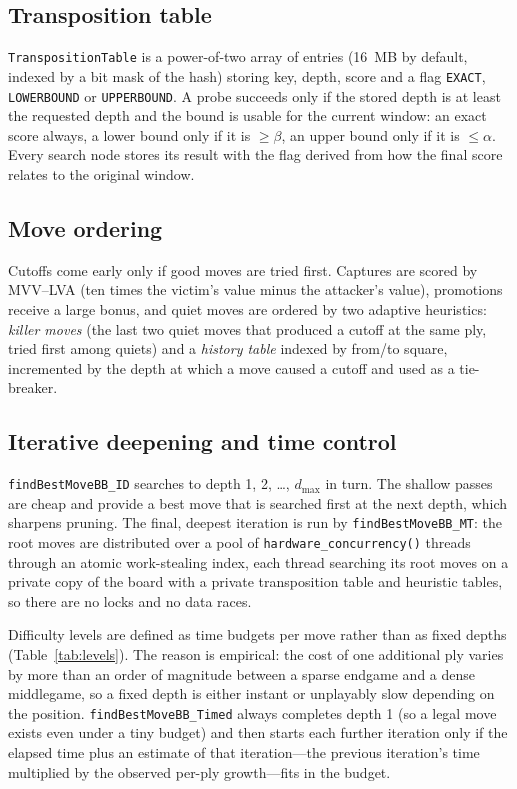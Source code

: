 \documentclass[conference]{IEEEtran}
\begin{document}
\subsection{Transposition table}
\texttt{TranspositionTable} is a power-of-two array of entries (16~MB by default, indexed by a bit mask of the hash) storing key, depth, score and a flag \texttt{EXACT}, \texttt{LOWERBOUND} or \texttt{UPPERBOUND}. A probe succeeds only if the stored depth is at least the requested depth and the bound is usable for the current window: an exact score always, a lower bound only if it is $\ge\beta$, an upper bound only if it is $\le\alpha$. Every search node stores its result with the flag derived from how the final score relates to the original window.

\subsection{Move ordering}
Cutoffs come early only if good moves are tried first. Captures are scored by MVV--LVA (ten times the victim's value minus the attacker's value), promotions receive a large bonus, and quiet moves are ordered by two adaptive heuristics: \emph{killer moves} (the last two quiet moves that produced a cutoff at the same ply, tried first among quiets) and a \emph{history table} indexed by from/to square, incremented by the depth at which a move caused a cutoff and used as a tie-breaker.

\subsection{Iterative deepening and time control}
\texttt{findBestMoveBB\_ID} searches to depth 1, 2, \ldots, $d_{\max}$ in turn. The shallow passes are cheap and provide a best move that is searched first at the next depth, which sharpens pruning. The final, deepest iteration is run by \texttt{findBestMoveBB\_MT}: the root moves are distributed over a pool of \texttt{hardware\_concurrency()} threads through an atomic work-stealing index, each thread searching its root moves on a private copy of the board with a private transposition table and heuristic tables, so there are no locks and no data races.

Difficulty levels are defined as time budgets per move rather than as fixed depths (Table~\ref{tab:levels}). The reason is empirical: the cost of one additional ply varies by more than an order of magnitude between a sparse endgame and a dense middlegame, so a fixed depth is either instant or unplayably slow depending on the position. \texttt{findBestMoveBB\_Timed} always completes depth 1 (so a legal move exists even under a tiny budget) and then starts each further iteration only if the elapsed time plus an estimate of that iteration---the previous iteration's time multiplied by the observed per-ply growth---fits in the budget.
\end{document}
